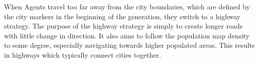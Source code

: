 When Agents travel too far away from the city boundaries, which are defined by the city markers in the beginning of the generation, they switch to a highway strategy.
The purpose of the highway strategy is simply to create longer roads with little change in direction.
It also aims to follow the population map density to some degree, especially navigating towards higher populated areas.
This results in highways which typically connect cities together.
